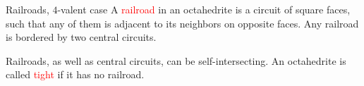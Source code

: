 \documentclass[%
pdf,
colorBG,
slideColor,
]{prosper}
\begin{document}
%


\begin{slide}{Railroads, $4$-valent case}
A \textcolor{red}{railroad} in an octahedrite is a circuit of square faces, such that any of them is adjacent to its neighbors on opposite faces. Any railroad is bordered by two central circuits.

\begin{center}
\begin{minipage}{5.5cm}
\centering
{}\par
\end{minipage}
\begin{minipage}{5.5cm}
\centering
{}\par
\end{minipage}
\end{center}

Railroads, as well as central circuits, can be self-intersecting. An octahedrite is called \textcolor{red}{tight} if it has no railroad.

\end{slide}
\end{document}
